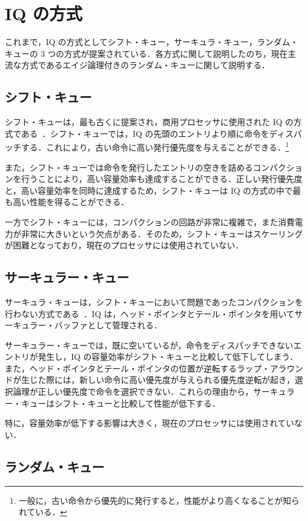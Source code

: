 \section{IQ の方式}
\label{sec:iq_scheme}
これまで，IQ の方式としてシフト・キュー，サーキュラ・キュー，ランダム・キューの 3 つの方式が提案されている．各方式に関して説明したのち，現在主流な方式であるエイジ論理付きのランダム・キューに関して説明する．

\subsection{シフト・キュー}
シフト・キューは，最も古くに提案され，商用プロセッサに使用された IQ の方式である~\cite{Farrell1998}．シフト・キューでは，IQ の先頭のエントリより順に命令をディスパッチする．これにより，古い命令に高い発行優先度を与えることができる．\footnote{一般に，古い命令から優先的に発行すると，性能がより高くなることが知られている．}

また，シフト・キューでは命令を発行したエントリの空きを詰めるコンパクションを行うことにより，高い容量効率も達成することができる．正しい発行優先度と，高い容量効率を同時に達成するため，シフト・キューは IQ の方式の中で最も高い性能を得ることができる．

一方でシフト・キューには，コンパクションの回路が非常に複雑で，また消費電力が非常に大きいという欠点がある．そのため，シフト・キューはスケーリングが困難となっており，現在のプロセッサには使用されていない．

\subsection{サーキュラー・キュー}
サーキュラ・キューは，シフト・キューにおいて問題であったコンパクションを行わない方式である~\cite{Abella:survey2003}．IQ は，ヘッド・ポインタとテール・ポインタを用いてサーキュラー・バッファとして管理される．

サーキュラー・キューでは，既に空いているが，命令をディスパッチできないエントリが発生し，IQ の容量効率がシフト・キューと比較して低下してしまう．また，ヘッド・ポインタとテール・ポインタの位置が逆転するラップ・アラウンドが生じた際には，新しい命令に高い優先度が与えられる優先度逆転が起き，選択論理が正しい優先度で命令を選択できない．これらの理由から，サーキュラー・キューはシフト・キューと比較して性能が低下する．

特に，容量効率が低下する影響は大きく，現在のプロセッサには使用されていない．

\subsection{ランダム・キュー}


